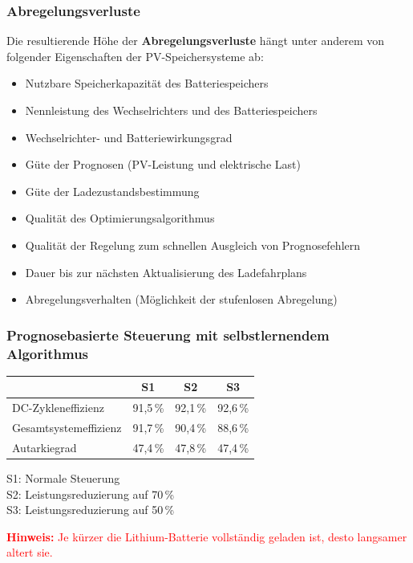 \subsubsection{Abregelungsverluste}

Die resultierende Höhe der \textbf{Abregelungsverluste} hängt unter anderem von folgender Eigenschaften der PV-Speichersysteme ab:
\begin{itemize}
  \item Nutzbare Speicherkapazität des Batteriespeichers
  \item Nennleistung des Wechselrichters und des Batteriespeichers
  \item Wechselrichter- und Batteriewirkungsgrad
  \item Güte der Prognosen (PV-Leistung und elektrische Last)
  \item Güte der Ladezustandsbestimmung
  \item Qualität des Optimierungsalgorithmus
  \item Qualität der Regelung zum schnellen Ausgleich von Prognosefehlern
  \item Dauer bis zur nächsten Aktualisierung des Ladefahrplans
  \item Abregelungsverhalten (Möglichkeit der stufenlosen Abregelung)
\end{itemize}

\subsubsection{Prognosebasierte Steuerung mit selbstlernendem Algorithmus}

\begin{tabular}{|l|c|c|c|}
    \hline
     & S1 & S2 & S3\\
    \hline
    DC-Zykleneffizienz & 91{,}5\,\% & 92{,}1\,\% & 92{,}6\,\% \\
    \hline
    Gesamtsystemeffizienz & 91{,}7\,\% & 90{,}4\,\% & 88{,}6\,\% \\
    \hline
    Autarkiegrad & 47{,}4\,\% & 47{,}8\,\% & 47{,}4\,\% \\
    \hline
\end{tabular}

S1: Normale Steuerung\\
S2: Leistungsreduzierung auf 70\,\%\\
S3: Leistungsreduzierung auf 50\,\%

\textcolor{red}{\textbf{Hinweis:} Je kürzer die Lithium-Batterie vollständig geladen ist, desto langsamer altert sie.}

